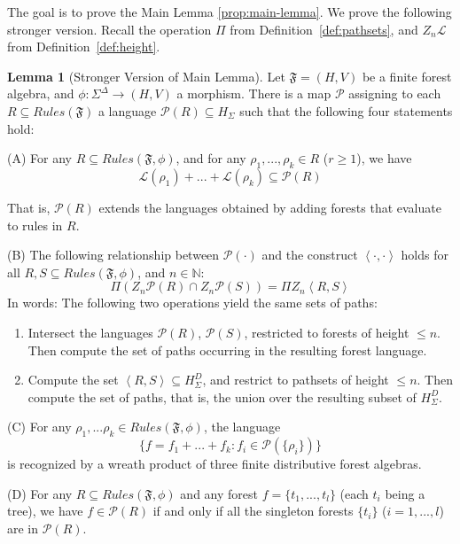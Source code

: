\documentclass[sigplan,9pt]{acmart}\settopmatter{printfolios=true,printccs=false,printacmref=false}
\newcounter{thm}
\newcounter{theorem}
\theoremstyle{definition}
\newtheorem{llemma}[thm]{Lemma}
\newcommand{\N}[0]{{\mathbb{N}}}
\newcommand{\La}[0]{{\mathcal{L}}}
\newcommand{\Ff}[0]{{\mathfrak{F}}}
\newcommand{\Pa}[0]{{\mathcal{P}}}
\newcommand{\Rn}[0]{Z_n}
\newcommand{\freedisth}[0]{{H_\Sigma^D}}
\begin{document}
The goal is to prove the Main Lemma \ref{prop:main-lemma}. We prove the following stronger version.
Recall the operation $\Pi$ from Definition~\ref{def:pathsets}, and $Z_n\La$ from Definition~\ref{def:height}.


\begin{llemma}[Stronger Version of Main Lemma]\label{prop:main-lemma-strong}
Let $\Ff = (H,V)$ be a finite forest algebra, and $\phi : \Sigma^\Delta\rightarrow(H,V)$ a morphism.
There is a map $\Pa$ assigning to each $R \subseteq Rules(\Ff)$ a language $\Pa(R) \subseteq H_\Sigma$ such that the following four statements hold: %

(A) For any $R \subseteq Rules(\Ff,\phi)$, and for any $\rho_1, ..., \rho_k \in R$ ($r \geq 1$), we have $$\La(\rho_1) + ... + \La(\rho_k) \subseteq \Pa(R)$$

That is, $\Pa(R)$ extends the languages obtained by adding forests that evaluate to rules in $R$.

(B) The following relationship between $\Pa(\cdot)$ and the construct $\left\langle\cdot,\cdot\right\rangle$ holds
for all $R, S \subseteq Rules(\Ff,\phi)$, and $n \in \N$: 
$$\Pi \left(\Rn\Pa(R) \cap \Rn\Pa(S)\right) =  \Pi \Rn \left\langle R, S \right\rangle$$
In words: The following two operations yield the same sets of paths:

\begin{enumerate}
\item Intersect the languages $\Pa(R)$, $\Pa(S)$, restricted to forests of height $\leq n$. Then compute the set of paths occurring in the resulting forest language. 
\item Compute the set $\left\langle R, S\right\rangle \subseteq \freedisth$, and restrict to pathsets of height $\leq n$. Then compute the set of paths, that is, the union over the resulting subset of $\freedisth$.
\end{enumerate}

(C) For any $\rho_1, ... \rho_k \in Rules(\Ff,\phi)$, the language $$\{f = f_1 + ... + f_k : f_i \in \Pa(\{\rho_i\})\}$$
is recognized by a wreath product of three finite distributive forest algebras.

(D) For any $R \subseteq Rules(\Ff,\phi)$ and any forest $f = \{t_1, ..., t_l\}$ (each $t_i$ being a tree), we have $f \in \Pa(R)$ if and only if all the singleton forests $\{t_i\}$ ($i = 1, ..., l$) are in $\Pa(R)$.
\end{llemma}
\end{document}
